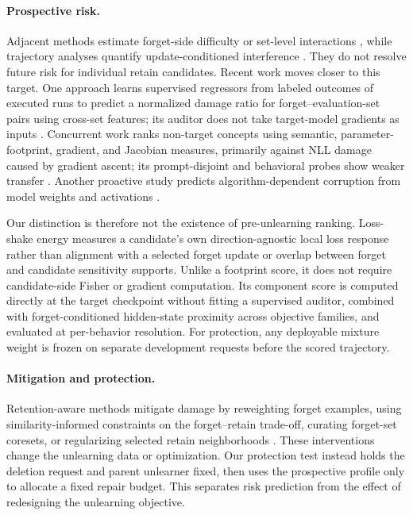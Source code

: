 \paragraph{Prospective risk.}
Adjacent methods estimate forget-side difficulty or set-level interactions
\cite{niu2025guard,chen2026hamu,cheng2026cud}, while trajectory analyses
quantify update-conditioned interference \cite{wang2025gradient}. They do
not resolve future risk for individual retain candidates. Recent work moves
closer to this target. One approach learns supervised
regressors from labeled outcomes of executed runs to predict a normalized
damage ratio for forget--evaluation-set pairs using cross-set features; its
auditor does not take target-model gradients as inputs
\cite{su2026preunlearn}. Concurrent work ranks non-target concepts using
semantic, parameter-footprint, gradient, and Jacobian measures, primarily
against NLL damage caused by gradient ascent; its prompt-disjoint and
behavioral probes show weaker transfer
\cite{anonymous2026neighbors}. Another proactive study predicts
algorithm-dependent corruption from model weights and activations
\cite{su2026corruption}.

Our distinction is therefore not the existence of pre-unlearning ranking.
Loss-shake energy measures a candidate's own direction-agnostic local loss
response rather than alignment with a selected forget update or overlap
between forget and candidate sensitivity supports. Unlike a footprint
score, it does not require candidate-side Fisher or gradient computation.
Its component score is computed directly at the target checkpoint without
fitting a supervised auditor, combined with forget-conditioned hidden-state
proximity across objective families, and evaluated at per-behavior
resolution. For protection, any deployable mixture weight is frozen on
separate development requests before the scored trajectory.

\paragraph{Mitigation and protection.}
Retention-aware methods mitigate damage by reweighting forget examples,
using similarity-informed constraints on the forget--retain trade-off,
curating forget-set coresets, or regularizing selected retain neighborhoods
\cite{niu2025guard,chen2026hamu,patil2025upcore,chang2025retain,
cheng2026entanglement}. These interventions change the unlearning data or
optimization. Our protection test instead holds the deletion request and
parent unlearner fixed, then uses the prospective profile only to allocate a
fixed repair budget. This separates risk prediction from the effect of
redesigning the unlearning objective.

